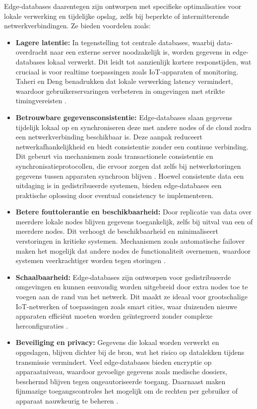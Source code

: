 Edge-databases daarentegen zijn ontworpen met specifieke optimalisaties voor lokale verwerking en tijdelijke opslag, zelfs bij beperkte of intermitterende netwerkverbindingen. Ze bieden voordelen zoals:
\begin{itemize}
    \item \textbf{Lagere latentie:}  
    In tegenstelling tot centrale databases, waarbij data-overdracht naar een externe server noodzakelijk is, worden gegevens in edge-databases lokaal verwerkt. Dit leidt tot aanzienlijk kortere responstijden, wat cruciaal is voor realtime toepassingen zoals IoT-apparaten of monitoring. Taheri en Deng benadrukken dat lokale verwerking latency vermindert, waardoor gebruikerservaringen verbeteren in omgevingen met strikte timingvereisten \autocite{Taheri2020}.

    \item \textbf{Betrouwbare gegevensconsistentie:}  
    Edge-databases slaan gegevens tijdelijk lokaal op en synchroniseren deze met andere nodes of de cloud zodra een netwerkverbinding beschikbaar is. Deze aanpak reduceert netwerkafhankelijkheid en biedt consistentie zonder een continue verbinding. Dit gebeurt via mechanismen zoals transactionele consistentie en synchronisatieprotocollen, die ervoor zorgen dat zelfs bij netwerkstoringen gegevens tussen apparaten synchroon blijven \autocite{Rahmani2018, Kleppmann2017}. Hoewel consistente data een uitdaging is in gedistribueerde systemen, bieden edge-databases een praktische oplossing door eventual consistency te implementeren.

    \item \textbf{Betere fouttolerantie en beschikbaarheid:}  
    Door replicatie van data over meerdere lokale nodes blijven gegevens toegankelijk, zelfs bij uitval van een of meerdere nodes. Dit verhoogt de beschikbaarheid en minimaliseert verstoringen in kritieke systemen. Mechanismen zoals automatische failover maken het mogelijk dat andere nodes de functionaliteit overnemen, waardoor systemen veerkrachtiger worden tegen storingen \autocite{Taheri2020}.

    \item \textbf{Schaalbaarheid:}  
    Edge-databases zijn ontworpen voor gedistribueerde omgevingen en kunnen eenvoudig worden uitgebreid door extra nodes toe te voegen aan de rand van het netwerk. Dit maakt ze ideaal voor grootschalige IoT-netwerken of toepassingen zoals smart cities, waar duizenden nieuwe apparaten efficiënt moeten worden geïntegreerd zonder complexe herconfiguraties \autocite{Rahmani2018}.

    \item \textbf{Beveiliging en privacy:}  
    Gegevens die lokaal worden verwerkt en opgeslagen, blijven dichter bij de bron, wat het risico op datalekken tijdens transmissie vermindert. Veel edge-databases bieden encryptie op apparaatniveau, waardoor gevoelige gegevens zoals medische dossiers, beschermd blijven tegen ongeautoriseerde toegang. Daarnaast maken fijnmazige toegangscontroles het mogelijk om de rechten per gebruiker of apparaat nauwkeurig te beheren \autocite{Taheri2020}.
\end{itemize}

